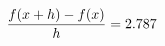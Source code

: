 \documentclass[preview]{standalone}
\begin{document}
\begin{align*}
\special{dvisvgm:raw <g id='unique000'>}\frac{f(x+h)-f(x)}{h} = 2.787\special{dvisvgm:raw </g>}
\end{align*}
\end{document}
